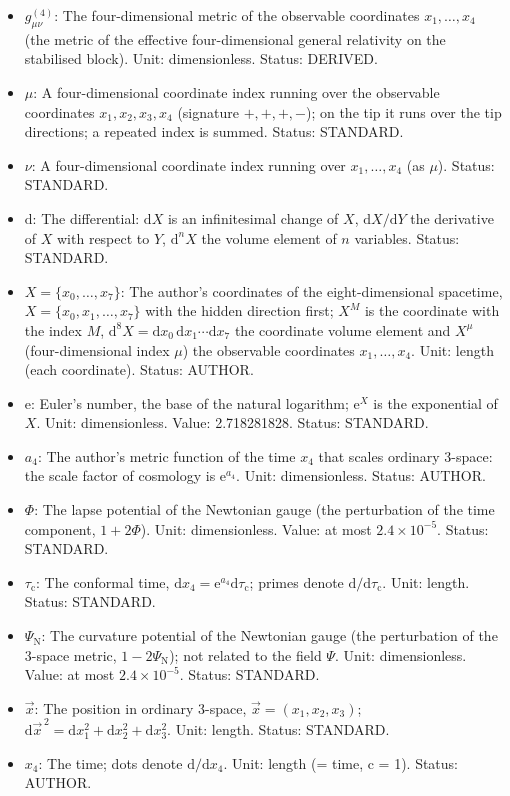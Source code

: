 \documentclass[
  10pt,
]{article}
\providecommand{\tightlist}{%
  \setlength{\itemsep}{0pt}\setlength{\parskip}{0pt}}
\begin{document}
\begin{itemize}
\tightlist
\item
  \(g^{(4)}_{\mu\nu}\): The four-dimensional metric of the observable
  coordinates \(x_1, \dots, x_4\) (the metric of the effective
  four-dimensional general relativity on the stabilised block). Unit:
  dimensionless. Status: DERIVED.
\item
  \(\mu\): A four-dimensional coordinate index running over the
  observable coordinates \(x_1, x_2, x_3, x_4\) (signature \(+,+,+,-\));
  on the tip it runs over the tip directions; a repeated index is
  summed. Status: STANDARD.
\item
  \(\nu\): A four-dimensional coordinate index running over
  \(x_1, \dots, x_4\) (as \(\mu\)). Status: STANDARD.
\item
  \(\mathrm{d}\): The differential: \(\mathrm{d}X\) is an infinitesimal
  change of \(X\), \(\mathrm{d}X/\mathrm{d}Y\) the derivative of \(X\)
  with respect to \(Y\), \(\mathrm{d}^nX\) the volume element of \(n\)
  variables. Status: STANDARD.
\item
  \(X = \{x_0, \dots, x_7\}\): The author's coordinates of the
  eight-dimensional spacetime, \(X = \{x_0, x_1, \dots, x_7\}\) with the
  hidden direction first; \(X^M\) is the coordinate with the index
  \(M\),
  \(\mathrm{d}^8X = \mathrm{d}x_0\,\mathrm{d}x_1\cdots\mathrm{d}x_7\)
  the coordinate volume element and \(X^\mu\) (four-dimensional index
  \(\mu\)) the observable coordinates \(x_1, \dots, x_4\). Unit: length
  (each coordinate). Status: AUTHOR.
\item
  \(\mathrm{e}\): Euler's number, the base of the natural logarithm;
  \(\mathrm{e}^{X}\) is the exponential of \(X\). Unit: dimensionless.
  Value: 2.718281828. Status: STANDARD.
\item
  \(a_4\): The author's metric function of the time \(x_4\) that scales
  ordinary 3-space: the scale factor of cosmology is
  \(\mathrm{e}^{a_4}\). Unit: dimensionless. Status: AUTHOR.
\item
  \(\Phi\): The lapse potential of the Newtonian gauge (the perturbation
  of the time component, \(1 + 2\Phi\)). Unit: dimensionless. Value: at
  most \(2.4\times10^{-5}\). Status: STANDARD.
\item
  \(\tau_{\mathrm{c}}\): The conformal time,
  \(\mathrm{d}x_4 = \mathrm{e}^{a_4}\mathrm{d}\tau_{\mathrm{c}}\);
  primes denote \(\mathrm{d}/\mathrm{d}\tau_{\mathrm{c}}\). Unit:
  length. Status: STANDARD.
\item
  \(\Psi_{\mathrm{N}}\): The curvature potential of the Newtonian gauge
  (the perturbation of the 3-space metric, \(1 - 2\Psi_{\mathrm{N}}\));
  not related to the field \(\Psi\). Unit: dimensionless. Value: at most
  \(2.4\times10^{-5}\). Status: STANDARD.
\item
  \(\vec x\): The position in ordinary 3-space,
  \(\vec x = (x_1, x_2, x_3)\);
  \(\mathrm{d}\vec x^{\,2} = \mathrm{d}x_1^2 + \mathrm{d}x_2^2 + \mathrm{d}x_3^2\).
  Unit: length. Status: STANDARD.
\item
  \(x_4\): The time; dots denote \(\mathrm{d}/\mathrm{d}x_4\). Unit:
  length (= time, c = 1). Status: AUTHOR.
\end{itemize}
\end{document}

